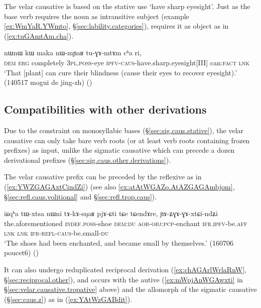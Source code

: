 The velar causative   is based on the stative use `have sharp eyesight'. Just as the base verb requires the noun  as intransitive subject (example \ref{ex:WmYaR.YWmto}, §\ref{sec:lability.categories}),  requires it as object as in (\ref{ex:tuGAmtAm.cha}).

\begin{exe}
\ex \label{ex:tuGAmtAm.cha}
\gll  nɯnɯ kɯ maka nɯ-mɲaʁ tu-ɣɤ-mtɤm cʰa ri, \\
\textsc{dem} \textsc{erg} completely \textsc{3pl}.\textsc{poss}-eye \textsc{ipfv}-\textsc{caus}-have.sharp.eyesight[III] can:\textsc{fact} \textsc{lnk} \\
\glt `That [plant] can cure their blindness (cause their eyes to recover eyesight).' (140517 mogui de jing-zh)
()
\end{exe} 

\subsection{Compatibilities with other derivations} \label{sec:velar.caus.other}
Due to the constraint on monosyllabic bases (§\ref{sec:sig.caus.stative}), the velar causative can only take bare verb roots (or at least verb roots containing frozen prefixes) as input, unlike the sigmatic causative which can precede a dozen derivational prefixes (§\ref{sec:sig.caus.other.derivations}).

The velar causative prefix can be preceded by the reflexive  as in (\ref{ex:YWZGAGAxtCindZi}) (see also \ref{ex:atAtWGAZo.AtAZGAGAmbjom}, §\ref{sec:refl.caus.volitional} and §\ref{sec:refl.trop.caus}).

\begin{exe}
\ex \label{ex:YWZGAGAxtCindZi}
\gll  iɕqʰa tɯ-xtsa nɯni tɤ-kɤ-sŋaʁ pjɤ-ɕti tɕe tɕendɤre, ɲɤ-ʑɣɤ-ɣɤ-xtɕi-ndʑi \\
the.aforementioned \textsc{indef}.\textsc{poss}-shoe \textsc{dem}:\textsc{du} \textsc{aor}-\textsc{obj}:\textsc{pcp}-enchant \textsc{ifr}.\textsc{ipfv}-be.\textsc{aff} \textsc{lnk} \textsc{lnk} \textsc{ifr}-\textsc{refl}-\textsc{caus}-be.small-\textsc{du} \\
\glt `The shoes had been enchanted, and became small by themselves.' (160706 poucet6)
()
\end{exe} 

It can also undergo reduplicated reciprocal derivation (\ref{ex:chAGArlWrlaRnW}, §\ref{sec:reciprocal.other}),  and occurs with the autive  (\ref{ex:mWpjAnWGAwxti} in §\ref{sec:velar.causative.tropative} above) and the  allomorph of the sigmatic causative (§\ref{sec:caus.z}) as in (\ref{ex:YAtWzGABdit}).
 

